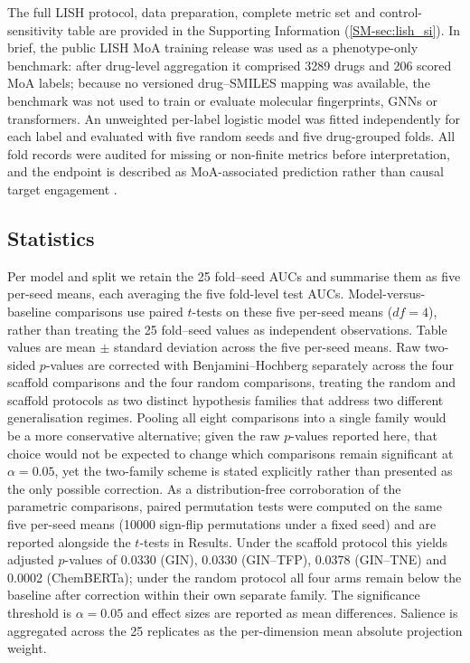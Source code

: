 \documentclass[11pt,a4paper]{article}
\begin{document}
The full LISH protocol, data preparation, complete metric set and control-sensitivity table are provided in the Supporting Information (\cref{SM-sec:lish_si}). In brief, the public LISH MoA training release was used as a phenotype-only benchmark: after drug-level aggregation it comprised \num{3289} drugs and \num{206} scored MoA labels; because no versioned drug--SMILES mapping was available, the benchmark was not used to train or evaluate molecular fingerprints, GNNs or transformers. An unweighted per-label logistic model was fitted independently for each label and evaluated with five random seeds and five drug-grouped folds. All fold records were audited for missing or non-finite metrics before interpretation, and the endpoint is described as MoA-associated prediction rather than causal target engagement \citep{Trapotsi2022MoA}.

\subsection{Statistics}

Per model and split we retain the \num{25} fold--seed AUCs and summarise them as five per-seed means, each averaging the five fold-level test AUCs. Model-versus-baseline comparisons use paired $t$-tests on these five per-seed means ($df=4$), rather than treating the \num{25} fold--seed values as independent observations. Table values are mean $\pm$ standard deviation across the five per-seed means. Raw two-sided $p$-values are corrected with Benjamini--Hochberg separately across the four scaffold comparisons and the four random comparisons, treating the random and scaffold protocols as two distinct hypothesis families that address two different generalisation regimes. Pooling all eight comparisons into a single family would be a more conservative alternative; given the raw $p$-values reported here, that choice would not be expected to change which comparisons remain significant at $\alpha=0.05$, yet the two-family scheme is stated explicitly rather than presented as the only possible correction. As a distribution-free corroboration of the parametric comparisons, paired permutation tests were computed on the same five per-seed means (\num{10000} sign-flip permutations under a fixed seed) and are reported alongside the $t$-tests in Results. Under the scaffold protocol this yields adjusted $p$-values of \num{0.0330} (GIN), \num{0.0330} (GIN--TFP), \num{0.0378} (GIN--TNE) and \num{0.0002} (ChemBERTa); under the random protocol all four arms remain below the baseline after correction within their own separate family. The significance threshold is $\alpha=\num{0.05}$ and effect sizes are reported as mean differences. Salience is aggregated across the \num{25} replicates as the per-dimension mean absolute projection weight.
\end{document}
